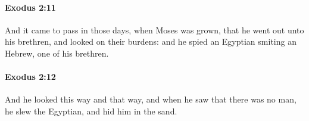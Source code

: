 		\paragraph{Exodus 2:11} %
			\label{EXODUS-2-11}

			And it came to pass in those days, when Moses was grown, that he went out unto his brethren, and looked on their burdens: and he spied an Egyptian smiting an Hebrew, one of his brethren.


		\paragraph{Exodus 2:12} %
			\label{EXODUS-2-12}

			And he looked this way and that way, and when he saw that there was no man, he slew the Egyptian, and hid him in the sand.


